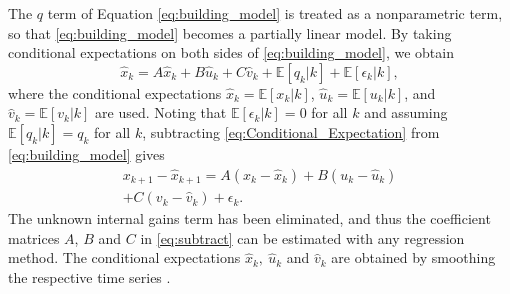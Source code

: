 The $q$ term of Equation \eqref{eq:building_model} is treated as a nonparametric term, so that \eqref{eq:building_model} becomes a partially linear model. By taking conditional expectations on both sides of \eqref{eq:building_model}, we obtain
\begin{equation}\label{eq:Conditional_Expectation}
\hat{x}_k = A\hat{x}_k + B\hat{u}_k + C\hat{v}_k + \mathbb{E}\left[ q_k \vert k \right] + \mathbb{E}\left[ \epsilon_k \vert k \right],
\end{equation}
\noindent
where the conditional expectations $\hat{x}_k = \mathbb{E}\left[ x_k \vert k \right]$, $\hat{u}_k = \mathbb{E}\left[ u_k \vert k \right]$, and $\hat{v}_k = \mathbb{E}\left[ v_k \vert k \right]$ are used.
Noting that $\mathbb{E}\left[ \epsilon_k \vert k \right] = 0$ for all $k$ and assuming $\mathbb{E}\left[ q_k \vert k \right] = q_k$ for all $k$, subtracting \eqref{eq:Conditional_Expectation} from \eqref{eq:building_model} gives
\begin{equation}\label{eq:subtract}
\begin{split}
x_{k+1} - \hat{x}_{k+1} = A\left( x_k - \hat{x}_k \right) + B\left( u_k - \hat{u}_k \right) \\
+ C \left( v_k - \hat{v}_k \right) + \epsilon_k.
\end{split}
\end{equation}
The unknown internal gains term has been eliminated, and thus the coefficient matrices $A$, $B$ and $C$ in \eqref{eq:subtract} can be estimated with any regression method.
The conditional expectations $\hat{x}_k, ~\hat{u}_k$ and $\hat{v}_k$ are obtained by smoothing the respective time series \cite{Aswani:2012aa}. 



